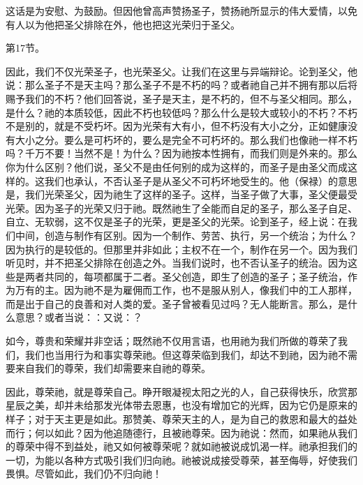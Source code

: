 这话是为安慰、为鼓励。但因他曾高声赞扬圣子，赞扬祂所显示的伟大爱情，以免有人以为他把圣父排除在外，他也把这光荣归于圣父。\par

第17节。\par

因此，我们不仅光荣圣子，也光荣圣父。让我们在这里与异端辩论。论到圣父，他说：那么圣子不是天主吗？那么圣子不是不朽的吗？或者祂自己并不拥有那以后将赐予我们的不朽？他们回答说，圣子是天主，是不朽的，但不与圣父相同。那么，是什么？祂的本质较低，因此不朽也较低吗？那么什么是较大或较小的不朽？不朽不是别的，就是不受朽坏。因为光荣有大有小，但不朽没有大小之分，正如健康没有大小之分。要么是可朽坏的，要么是完全不可朽坏的。那么我们也像祂一样不朽吗？千万不要！当然不是！为什么？因为祂按本性拥有，而我们则是外来的。那么你为什么区别？他们说，圣父不是由任何别的成为这样的，而圣子是由圣父而成这样的。这我们也承认，不否认圣子是从圣父不可朽坏地受生的。他（保禄）的意思是，我们光荣圣父，因为祂生了这样的圣子。这样，当圣子做了大事，圣父便最受光荣。因为圣子的光荣又归于祂。既然祂生了全能而自足的圣子，那么圣子自足、自立、无软弱，这不仅是圣子的光荣，更是圣父的光荣。论到圣子，经上说：在我们中间，创造与制作有区别。因为一个制作、劳苦、执行，另一个统治；为什么？因为执行的是较低的。但那里并非如此；主权不在一个，制作在另一个。因为我们听见时，并不把圣父排除在创造之外。当我们说时，也不否认圣子的统治。因为这些是两者共同的，每项都属于二者。圣父创造，即生了创造的圣子；圣子统治，作为万有的主。因为祂不是为雇佣而工作，也不是服从别人，像我们中的工人那样，而是出于自己的良善和对人类的爱。圣子曾被看见过吗？无人能断言。那么，是什么意思？或者当说：：又说：？\par

\par

如今，尊贵和荣耀并非空话；既然祂不仅用言语，也用祂为我们所做的尊荣了我们，我们也当用行为和事实尊荣祂。但这尊荣临到我们，却达不到祂，因为祂不需要来自我们的尊荣，我们却需要来自祂的尊荣。\par

因此，尊荣祂，就是尊荣自己。睁开眼凝视太阳之光的人，自己获得快乐，欣赏那星辰之美，却并未给那发光体带去恩惠，也没有增加它的光辉，因为它仍是原来的样子；对于天主更是如此。那赞美、尊荣天主的人，是为自己的救恩和最大的益处而行；何以如此？因为他追随德行，且被祂尊荣。因为祂说：然而，如果祂从我们的尊荣中得不到益处，祂又如何被尊荣呢？就如祂被说成饥渴一样。祂承担我们的一切，为能以各种方式吸引我们归向祂。祂被说成接受尊荣，甚至侮辱，好使我们畏惧。尽管如此，我们仍不归向祂！\par

